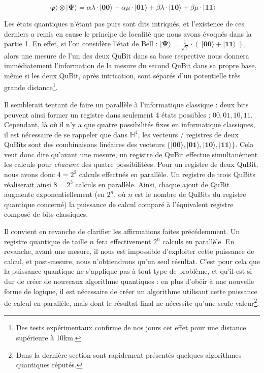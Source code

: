 \documentclass[a4paper,12pt]{report}
\newcommand{\quSt}[1]{\bm{|#1\rangle}}
\begin{document}
\begin{equation}
	\quSt{\varphi} \otimes \quSt{\Psi} = \alpha \lambda \cdot \quSt{00} + \alpha \mu \cdot \quSt{01} + \beta \lambda \cdot \quSt{10} + \beta \mu \cdot \quSt{11}
\end{equation}

\vspace{1\baselineskip}

\par{
	Les états quantiques n'étant pas purs sont dits intriqués, et l'existence de ces derniers a remis en cause le principe de localité que nous avons évoqués dans la partie 1. En effet, si l'on considère l'état de Bell : $\quSt{\Psi} = \frac{1}{\sqrt{2}} \cdot (~ \quSt{00} + \quSt{11}  ~)$, alors une mesure de l'un des deux QuBit dans sa base respective nous donnera immédiatement l'information de la mesure du second QuBit dans sa propre base, même si les deux QuBit, après intrication, sont séparés d'un potentielle très grande distance\footnote{Des tests expérimentaux confirme de nos jours cet effet pour une distance supérieure à 10km.}.
}

\vspace{1\baselineskip}

\par{
	Il semblerait tentant de faire un parallèle à l'informatique classique : deux bits peuvent ainsi former un registre dans seulement 4 états possibles : ${ 00, 01, 10, 11 }$. Cependant, là où il n'y a que quatre possibilités fixes en informatique classiques, il est nécessaire de se rappeler que dans $\mathbb{H}^4$, les vecteurs / registres de deux QuBits sont des combinaisons linéaires des vecteurs $ \{ \quSt{00}, \quSt{01}, \quSt{10}, \quSt{11} \} $. Cela veut donc dire qu'avant une mesure, un registre de QuBit effectue simultanément les calculs pour \emph{chacune} des quatre possibilitées. Pour un registre de deux QuBit, nous avons donc $4 = 2^2$ calculs effectués en parallèle. Un registre de trois QuBits réaliserait ainsi $8 = 2^3$ calculs en parallèle. Ainsi, chaque ajout de QuBit augmente exponentiellement (en $2^n$, où $n$ est le nombre de QuBits du registre quantique concerné) la puissance de calcul comparé à l'équivalent registre composé de bits classiques.
}

\vspace{1\baselineskip}

\par{
	Il convient en revanche de clarifier les affirmations faites précédemment. Un registre quantique de taille $n$ fera effectivement $2^n$ calculs en parallèle. En revanche, avant une mesure, il nous est impossible d'exploiter cette puissance de calcul, et post-mesure, nous n'obtiendrons qu'un seul résultat. C'est pour cela que la puissance quantique ne s'applique pas à tout type de problème, et qu'il est si dur de créer de nouveaux algorithme quantiques : en plus d'obéir à une nouvelle forme de logique, il est nécessaire de créer un algorithme utilisant cette puissance de calcul en parallèle, mais dont le résultat final ne nécessite qu'une seule valeur\footnote{Dans la dernière section sont rapidement présentés quelques algorithmes quantiques réputés. }.
}
\end{document}
